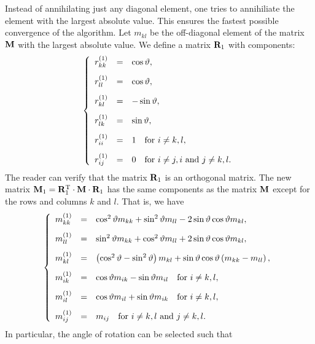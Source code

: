 \documentclass[twoside]{book}
\begin{document}
Instead of annihilating just any diagonal element, one tries to
annihiliate the element with the largest absolute value. This
ensures the fastest possible convergence of the algorithm. Let
$m_{kl}$ be the off-diagonal element of the matrix ${\bf M}$ with
the largest absolute value. We define a matrix ${\bf R}_1$ with
components:
\begin{equation}
  \left\{
  \begin{array}{lcl}
    r^{\left(1\right)}_{kk} &=& \cos\vartheta, \\*[2ex]
    r^{\left(1\right)}_{ll} &=& \cos\vartheta, \\*[2ex]
    r^{\left(1\right)}_{kl} &=& -\sin\vartheta, \\*[2ex]
    r^{\left(1\right)}_{lk} &=& \sin\vartheta, \\*[2ex]
    r^{\left(1\right)}_{ii} &=& 1\mbox{\quad for $i\ne k,l$}, \\*[2ex]
    r^{\left(1\right)}_{ij} &=& 0\mbox{\quad for $i\ne j, i$ and $j \ne k,l$.}
  \end{array}
  \right.
\end{equation}
The reader can verify that the matrix ${\bf R}_1$ is an orthogonal
matrix. The new matrix ${\bf M}_1={\bf R}^{\mathop{\rm T}}_1\cdot{\bf
M}\cdot{\bf R}_1$ has the same components as the matrix ${\bf M}$
except for the rows and columns $k$ and $l$. That is, we have
\begin{equation}
\label{eq:jacobistep}
  \left\{
  \begin{array}{lcl}
    m^{\left(1\right)}_{kk} &=& \cos^2\vartheta m_{kk}+\sin^2\vartheta m_{ll} - 2\sin\vartheta\cos\vartheta m_{kl}, \\*[2ex]
    m^{\left(1\right)}_{ll} &=& \sin^2\vartheta m_{kk}+\cos^2\vartheta m_{ll} + 2\sin\vartheta\cos\vartheta m_{kl}, \\*[2ex]
    m^{\left(1\right)}_{kl} &=& \left(\cos^2\vartheta-\sin^2\vartheta\right)m_{kl}+\sin\vartheta\cos\vartheta
    \left(m_{kk}-m_{ll}\right), \\*[2ex]
    m^{\left(1\right)}_{ik} &=& \cos\vartheta m_{ik}-\sin\vartheta m_{il}\mbox{\quad for $i\ne k,l$}, \\*[2ex]
    m^{\left(1\right)}_{il} &=& \cos\vartheta m_{il}+\sin\vartheta m_{ik}\mbox{\quad for $i\ne k,l$}, \\*[2ex]
    m^{\left(1\right)}_{ij} &=& m_{ij}\mbox{\quad for $i\ne k,l$ and $j\ne k,l$}.  \end{array}
  \right.
\end{equation}
In particular, the angle of rotation can be selected such that
\end{document}
